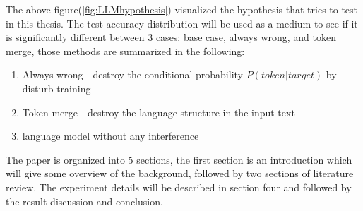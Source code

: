 \documentclass[12pt]{article}
\begin{document}
The above figure(\ref{fig:LLMhypothesis}) visualized the hypothesis that tries to test in this thesis. The test accuracy distribution will be used as a medium to see if it is significantly different between 3 cases: base case, always wrong, and token merge, those methods are summarized in the following:
\begin{enumerate}
    \item Always wrong - destroy the conditional probability $P(token|target)$ by disturb training
    \item Token merge - destroy the language structure in the input text
    \item language model without any interference
\end{enumerate}

The paper is organized into 5 sections, the first section is an introduction which will give some overview of the background, followed by two sections of literature review. The experiment details will be described in section four and followed by the result discussion and conclusion.
\end{document}
